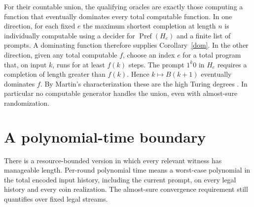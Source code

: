 \documentclass[11pt]{article}
\newcommand{\Pref}{\operatorname{Pref}}
\begin{document}
For their countable union, the qualifying oracles are exactly those computing a function that eventually dominates every total computable function. In one direction, for each fixed $e$ the maximum shortest completion at length $n$ is individually computable using a decider for $\Pref(H_e)$ and a finite list of prompts. A dominating function therefore supplies Corollary~\ref{dom}. In the other direction, given any total computable $f$, choose an index $e$ for a total program that, on input $k$, runs for at least $f(k)$ steps. The prompt $1^k0$ in $H_e$ requires a completion of length greater than $f(k)$. Hence $k\mapsto B(k+1)$ eventually dominates $f$. By Martin's characterization these are the high Turing degrees \cite{martin}. In particular no computable generator handles the union, even with almost-sure randomization.

\section{A polynomial-time boundary}
There is a resource-bounded version in which every relevant witness has manageable length. Per-round polynomial time means a worst-case polynomial in the total encoded input history, including the current prompt, on every legal history and every coin realization. The almost-sure convergence requirement still quantifies over fixed legal streams.
\end{document}
